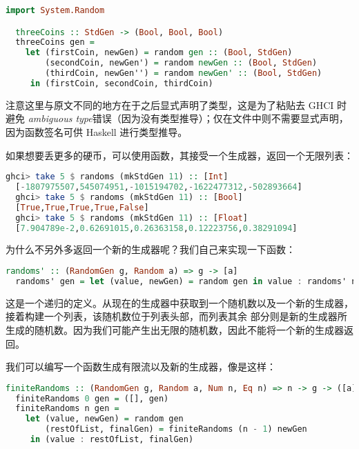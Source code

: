 \documentclass[./main.tex]{subfiles}
\begin{document}
\begin{lstlisting}[language=Haskell]
  import System.Random

  threeCoins :: StdGen -> (Bool, Bool, Bool)
  threeCoins gen =
    let (firstCoin, newGen) = random gen :: (Bool, StdGen)
        (secondCoin, newGen') = random newGen :: (Bool, StdGen)
        (thirdCoin, newGen'') = random newGen' :: (Bool, StdGen)
     in (firstCoin, secondCoin, thirdCoin)
\end{lstlisting}

注意这里与原文不同的地方在于之后显式声明了类型，这是为了粘贴去 GHCI 时避免
\textit{ambiguous type}错误（因为没有类型推导）；仅在文件中则不需要显式声明，因为函数签名可供 Haskell 进行类型推导。

如果想要丢更多的硬币，可以使用函数，其接受一个生成器，返回一个无限列表：

\begin{lstlisting}[language=Haskell]
  ghci> take 5 $ randoms (mkStdGen 11) :: [Int]
  [-1807975507,545074951,-1015194702,-1622477312,-502893664]
  ghci> take 5 $ randoms (mkStdGen 11) :: [Bool]
  [True,True,True,True,False]
  ghci> take 5 $ randoms (mkStdGen 11) :: [Float]
  [7.904789e-2,0.62691015,0.26363158,0.12223756,0.38291094]
\end{lstlisting}

为什么不另外多返回一个新的生成器呢？我们自己来实现一下函数：

\begin{lstlisting}[language=Haskell]
  randoms' :: (RandomGen g, Random a) => g -> [a]
  randoms' gen = let (value, newGen) = random gen in value : randoms' newGen
\end{lstlisting}

这是一个递归的定义。从现在的生成器中获取到一个随机数以及一个新的生成器，接着构建一个列表，该随机数位于列表头部，而列表其余
部分则是新的生成器所生成的随机数。因为我们可能产生出无限的随机数，因此不能将一个新的生成器返回。

我们可以编写一个函数生成有限流以及新的生成器，像是这样：

\begin{lstlisting}[language=Haskell]
  finiteRandoms :: (RandomGen g, Random a, Num n, Eq n) => n -> g -> ([a], g)
  finiteRandoms 0 gen = ([], gen)
  finiteRandoms n gen =
    let (value, newGen) = random gen
        (restOfList, finalGen) = finiteRandoms (n - 1) newGen
     in (value : restOfList, finalGen)
\end{lstlisting}
\end{document}
